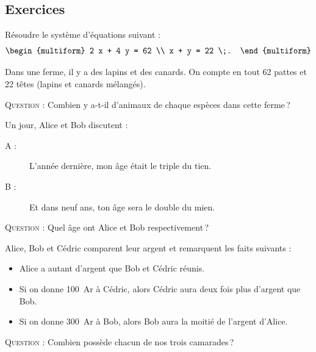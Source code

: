 \TCDLessonStyleOff
\clearpage
\newpage
\subsection{Exercices}
      \begin{exo}
            R\'esoudre le syst\`eme d'\'equations suivant :
            \[
                  \begin{multiform}
                        2 x + 4 y = 62 \\
                          x +   y = 22 \;.
                  \end{multiform}
            \]
      \end{exo}
      \begin{exo}
            Dans une ferme, il y a des lapins et des canards.
            On compte en tout 62 pattes et 22 t\^etes (lapins et canards m\'elang\'es).
            
            \textsc{Question :} Combien y a-t-il d'animaux de chaque esp\`eces dans cette ferme\,?
      \end{exo}
      \begin{exo}
            Un jour, Alice et Bob discutent :
            \begin{description}
                  \item[A : ] L'ann\'ee derni\`ere, mon \^age \'etait le triple du tien.
                  \item[B : ] Et dans neuf ans, ton \^age sera le double du mien.
            \end{description}
            \textsc{Question :} Quel \^age ont Alice et Bob respectivement\,?
      \end{exo}
      \begin{exo}
            \label{exo:mise en equation systeme lineaire a 3 inconnues}
            Alice, Bob et C\'edric comparent leur argent et remarquent les faits suivants :
            \begin{itemize}
                  \item Alice a autant d'argent que Bob et C\'edric r\'eunis.
                  \item Si on donne 100~Ar \`a C\'edric, alors C\'edric aura deux fois plus d'argent que Bob.
                  \item Si on donne 300~Ar \`a Bob, alors Bob aura la moiti\'e de l'argent d'Alice.
            \end{itemize}
            \textsc{Question :} Combien poss\`ede chacun de nos trois camarades\,?
      \end{exo}
